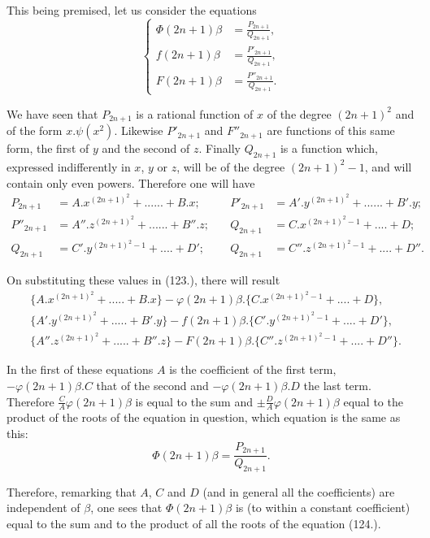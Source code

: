 \documentclass{article}
\begin{document}

This being premised, let us consider the equations
\[ \left\{\begin{aligned}
\Phi(2n+1)\beta&=\frac{P_{2n+1}}{Q_{2n+1}},\\
f(2n+1)\beta&=\frac{P'_{2n+1}}{Q_{2n+1}},\\
F(2n+1)\beta&=\frac{P''_{2n+1}}{Q_{2n+1}}.
\end{aligned}\right. \tag{123.} \]

We have seen that $P_{2n+1}$ is a rational function of $x$ of the degree $(2n+1)^{2}$ and of the form $x.\psi(x^{2})$. Likewise $P'_{2n+1}$ and $F''_{2n+1}$ are functions of this same form, the first of $y$ and the second of $z$. Finally $Q_{2n+1}$ is a function which, expressed indifferently in $x$, $y$ or $z$, will be of the degree $(2n+1)^{2}-1$, and will contain only even powers.
Therefore one will have
\[ \begin{aligned}
P_{2n+1}&=A.x^{(2n+1)^{2}}+......+B.x;&\quad P'_{2n+1}&=A'.y^{(2n+1)^{2}}+......+B'.y;\\
P''_{2n+1}&=A''.z^{(2n+1)^{2}}+......+B''.z;&\quad Q_{2n+1}&=C.x^{(2n+1)^{2}-1}+....+D;\\
Q_{2n+1}&=C'.y^{(2n+1)^{2}-1}+....+D';&\quad Q_{2n+1}&=C''.z^{(2n+1)^{2}-1}+....+D''.
\end{aligned} \]

On substituting these values in (123.), there will result
\[ \begin{aligned}
&\{A.x^{(2n+1)^{2}}+.....+B.x\}-\varphi(2n+1)\beta.\{C.x^{(2n+1)^{2}-1}+....+D\},\\
&\{A'.y^{(2n+1)^{2}}+.....+B'.y\}-f(2n+1)\beta.\{C'.y^{(2n+1)^{2}-1}+....+D'\},\\
&\{A''.z^{(2n+1)^{2}}+.....+B''.z\}-F(2n+1)\beta.\{C''.z^{(2n+1)^{2}-1}+....+D''\}.
\end{aligned} \]

In the first of these equations $A$ is the coefficient of the first term, $-\varphi(2n+1)\beta.C$ that of the second and $-\varphi(2n+1)\beta.D$ the last term. Therefore $\frac{C}{A}\varphi(2n+1)\beta$ is equal to the sum and $\pm\frac{D}{A}\varphi(2n+1)\beta$ equal to the product of the roots of the equation in question, which equation is the same as this:
\[ \Phi(2n+1)\beta=\frac{P_{2n+1}}{Q_{2n+1}}. \tag{124.} \]

Therefore, remarking that $A$, $C$ and $D$ (and in general all the coefficients) are independent of $\beta$, one sees that $\Phi(2n+1)\beta$ is (to within a constant coefficient) equal to the sum and to the product of all the roots of the equation (124.).
\end{document}
